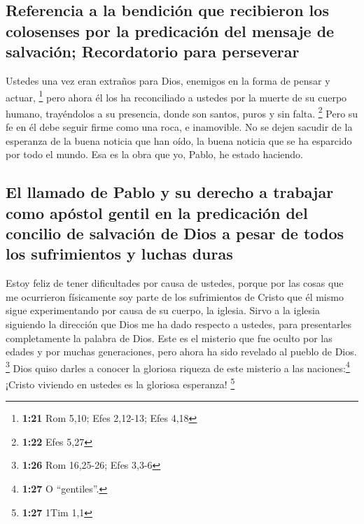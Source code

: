 \hypertarget{referencia-a-la-bendiciuxf3n-que-recibieron-los-colosenses-por-la-predicaciuxf3n-del-mensaje-de-salvaciuxf3n-recordatorio-para-perseverar}{%
\subsection{Referencia a la bendición que recibieron los colosenses por
la predicación del mensaje de salvación; Recordatorio para
perseverar}\label{referencia-a-la-bendiciuxf3n-que-recibieron-los-colosenses-por-la-predicaciuxf3n-del-mensaje-de-salvaciuxf3n-recordatorio-para-perseverar}}

 Ustedes una vez eran extraños para Dios, enemigos en la
forma de pensar y actuar, \footnote{\textbf{1:21} Rom 5,10; Efes
  2,12-13; Efes 4,18}  pero ahora él los ha reconciliado
a ustedes por la muerte de su cuerpo humano, trayéndolos a su presencia,
donde son santos, puros y sin falta. \footnote{\textbf{1:22} Efes 5,27}
 Pero su fe en él debe seguir firme como una roca, e
inamovible. No se dejen sacudir de la esperanza de la buena noticia que
han oído, la buena noticia que se ha esparcido por todo el mundo. Esa es
la obra que yo, Pablo, he estado haciendo.

\hypertarget{el-llamado-de-pablo-y-su-derecho-a-trabajar-como-apuxf3stol-gentil-en-la-predicaciuxf3n-del-concilio-de-salvaciuxf3n-de-dios-a-pesar-de-todos-los-sufrimientos-y-luchas-duras}{%
\subsection{El llamado de Pablo y su derecho a trabajar como apóstol
gentil en la predicación del concilio de salvación de Dios a pesar de
todos los sufrimientos y luchas
duras}\label{el-llamado-de-pablo-y-su-derecho-a-trabajar-como-apuxf3stol-gentil-en-la-predicaciuxf3n-del-concilio-de-salvaciuxf3n-de-dios-a-pesar-de-todos-los-sufrimientos-y-luchas-duras}}

 Estoy feliz de tener dificultades por causa de ustedes,
porque por las cosas que me ocurrieron físicamente soy parte de los
sufrimientos de Cristo que él mismo sigue experimentando por causa de su
cuerpo, la iglesia.  Sirvo a la iglesia siguiendo la
dirección que Dios me ha dado respecto a ustedes, para presentarles
completamente la palabra de Dios.  Este es el misterio
que fue oculto por las edades y por muchas generaciones, pero ahora ha
sido revelado al pueblo de Dios. \footnote{\textbf{1:26} Rom 16,25-26;
  Efes 3,3-6}  Dios quiso darles a conocer la gloriosa
riqueza de este misterio a las naciones:\footnote{\textbf{1:27} O
  ``gentiles''.} ¡Cristo viviendo en ustedes es la gloriosa esperanza!
\footnote{\textbf{1:27} 1Tim 1,1}

